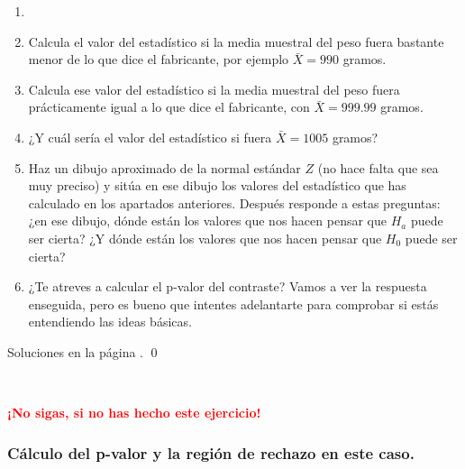 \documentclass[10pt,a4paper]{article}\usepackage[]{graphicx}\usepackage[]{color}
\newcounter {cont01}
\begin{document}
\begin{ejercicio}
\label{tut07:ejercicio04}
\begin{enumerate}
  \item[]
  \item Calcula el valor del estadístico si la media muestral del peso fuera bastante menor de lo que dice el fabricante, por ejemplo $\bar X=990$ gramos.

  \item Calcula ese valor del estadístico si la media muestral del peso fuera prácticamente igual a lo que dice el fabricante, con $\bar X = 999.99$ gramos.

  \item ¿Y cuál sería el valor del estadístico si fuera $\bar X=1005$ gramos?

  \item Haz un dibujo aproximado de la normal estándar $Z$ (no hace falta que sea muy preciso) y sitúa en ese dibujo los valores del estadístico que has calculado en los apartados anteriores. Después responde a estas preguntas: ¿en ese dibujo, dónde están los valores  que nos hacen pensar que $H_a$ puede ser cierta? ¿Y dónde están los valores que nos hacen pensar que $H_0$ puede ser cierta?

  \item ¿Te atreves a calcular el p-valor del contraste? Vamos a ver la respuesta enseguida, pero es bueno que intentes adelantarte para comprobar si estás entendiendo las ideas básicas.
\end{enumerate}
Soluciones en la página \pageref{tut07:ejercicio04:sol}.
\qed
\end{ejercicio}

\quad\\
\vspace{2cm}
\begin{center}
\textcolor{red}{\bf\LARGE ¡No sigas, si no has hecho este ejercicio!}
\end{center}
\vspace{2cm}
\newpage

\subsubsection*{Cálculo del p-valor y la región de rechazo en este caso.}
\end{document}
